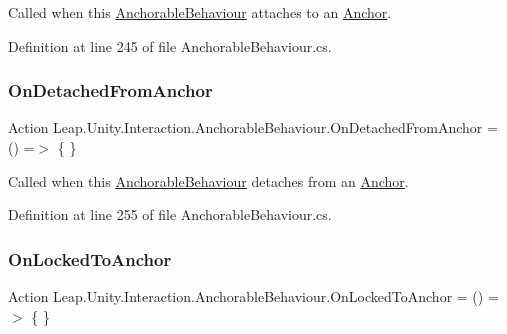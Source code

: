 Called when this \mbox{\hyperlink{class_leap_1_1_unity_1_1_interaction_1_1_anchorable_behaviour}{Anchorable\+Behaviour}} attaches to an \mbox{\hyperlink{class_leap_1_1_unity_1_1_interaction_1_1_anchor}{Anchor}}. 



Definition at line 245 of file Anchorable\+Behaviour.\+cs.

\mbox{\label{class_leap_1_1_unity_1_1_interaction_1_1_anchorable_behaviour_a61aec444eb2b020981d37d7a15c1b280}} 
\subsubsection{\texorpdfstring{OnDetachedFromAnchor}{OnDetachedFromAnchor}}
{\footnotesize\ttfamily Action Leap.\+Unity.\+Interaction.\+Anchorable\+Behaviour.\+On\+Detached\+From\+Anchor = () =$>$ \{ \}}



Called when this \mbox{\hyperlink{class_leap_1_1_unity_1_1_interaction_1_1_anchorable_behaviour}{Anchorable\+Behaviour}} detaches from an \mbox{\hyperlink{class_leap_1_1_unity_1_1_interaction_1_1_anchor}{Anchor}}. 



Definition at line 255 of file Anchorable\+Behaviour.\+cs.

\mbox{\label{class_leap_1_1_unity_1_1_interaction_1_1_anchorable_behaviour_a03147adbeb35c85e8bded5c70a266f5d}} 
\subsubsection{\texorpdfstring{OnLockedToAnchor}{OnLockedToAnchor}}
{\footnotesize\ttfamily Action Leap.\+Unity.\+Interaction.\+Anchorable\+Behaviour.\+On\+Locked\+To\+Anchor = () =$>$ \{ \}}



